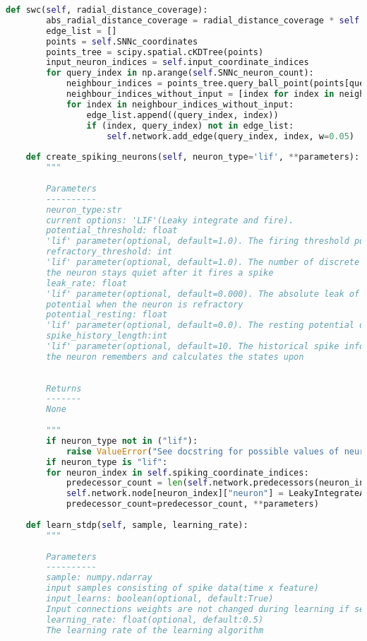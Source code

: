 \begin{lstlisting}[language=Python, caption={Python code for modular implementation of SNNc}]
	def swc(self, radial_distance_coverage):
		abs_radial_distance_coverage = radial_distance_coverage * self.SNNc_MAX_DISTANCE
		edge_list = []
		points = self.SNNc_coordinates
		points_tree = scipy.spatial.cKDTree(points)
		input_neuron_indices = self.input_coordinate_indices
		for query_index in np.arange(self.SNNc_neuron_count):
			neighbour_indices = points_tree.query_ball_point(points[query_index], abs_radial_distance_coverage)
			neighbour_indices_without_input = [index for index in neighbour_indices if index not in input_neuron_indices]
			for index in neighbour_indices_without_input:
				edge_list.append((query_index, index))
				if (index, query_index) not in edge_list:
					self.network.add_edge(query_index, index, w=0.05)
	
	def create_spiking_neurons(self, neuron_type='lif', **parameters):
		"""
	
		Parameters
		----------
		neuron_type:str
		current options: 'LIF'(Leaky integrate and fire).
		potential_threshold: float
		'lif' parameter(optional, default=1.0). The firing threshold potential
		refractory_threshold: int
		'lif' parameter(optional, default=1.0). The number of discrete times
		the neuron stays quiet after it fires a spike
		leak_rate: float
		'lif' parameter(optional, default=0.000). The absolute leak of
		potential when the neuron is refractory
		potential_resting: float
		'lif' parameter(optional, default=0.0). The resting potential of the neuron.
		spike_history_length:int
		'lif' parameter(optional, default=10. The historical spike information that
		the neuron remembers and calculates the states upon
	
	
		Returns
		-------
		None
	
		"""
		if neuron_type not in ("lif"):
			raise ValueError("See docstring for possible values of neuron_type!!")
		if neuron_type is "lif":
		for neuron_index in self.spiking_coordinate_indices:
			predecessor_count = len(self.network.predecessors(neuron_index))
			self.network.node[neuron_index]["neuron"] = LeakyIntegrateAndFireNeuron(
			predecessor_count=predecessor_count, **parameters)
	
	def learn_stdp(self, sample, learning_rate):
		"""
	
		Parameters
		----------
		sample: numpy.ndarray
		input samples consisting of spike data(time x feature)
		input_learns: boolean(optional, default:True)
		Input connections weights are not changed during learning if set to False
		learning_rate: float(optional, default:0.5)
		The learning rate of the learning algorithm
	

\end{lstlisting}
